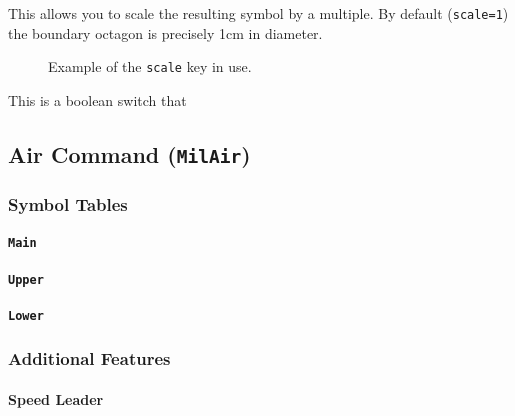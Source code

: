 \documentclass[a4paper, titlepage]{article}
\begin{document}
This allows you to scale the resulting symbol by a multiple. By default (\texttt{scale=1}) the boundary octagon is precisely 1cm in diameter.

\begin{figure}[H]
\centering
{}
\caption{Example of the \texttt{scale} key in use.}
\end{figure}

This is a boolean switch that 

\subsection{Air Command (\textbf{\texttt{MilAir}})}

\subsubsection{Symbol Tables}

\paragraph{\texttt{Main}}
%

\paragraph{\texttt{Upper}}
%

\paragraph{\texttt{Lower}}
%

\subsubsection{Additional Features}

\paragraph{Speed Leader}
\end{document}
